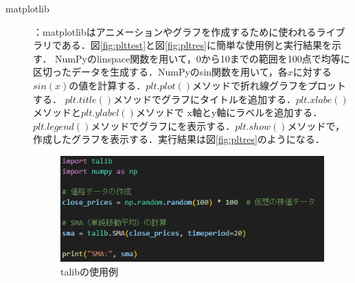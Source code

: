 \begin{description}
  \item [matplotlib]：matplotlibはアニメーションやグラフを作成するために使われるライブラリである\cite{matplotlib}．図\ref{fig:plttest}と図\ref{fig:pltres}に簡単な使用例と実行結果を示す．
  NumPyのlinspace関数を用いて，0から10までの範囲を100点で均等に区切ったデータを生成する．NumPyのsin関数を用いて，各$x$に対する$sin(x)$の値を計算する．$plt.plot()$メソッドで折れ線グラフをプロットする．
  $plt.title()$メソッドでグラフにタイトルを追加する．$plt.xlabe()$メソッドと$plt.ylabel()$メソッドで x軸とy軸にラベルを追加する．$plt.legend()$メソッドでグラフにを表示する．$plt.show()$メソッドで，
  作成したグラフを表示する．実行結果は図\ref{fig:pltres}のようになる．



 
 

  \begin{figure}[H]
    \centering
    \includegraphics[width=110mm]{fig/talib_test.png}
    \caption{talibの使用例}
    \label{fig:talibtest}
   \end{figure}


\end{description}
